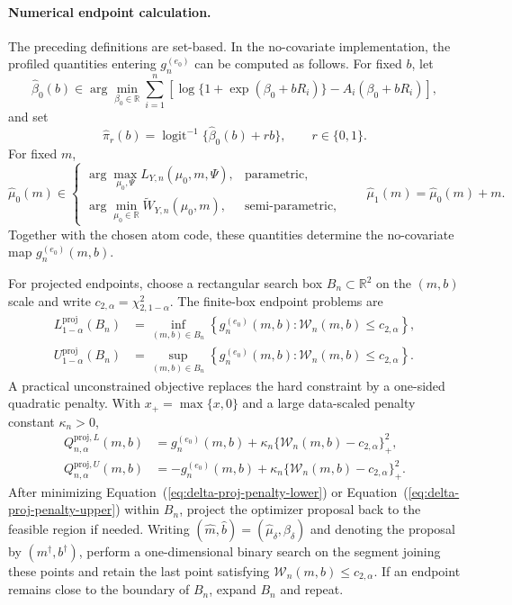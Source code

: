 \documentclass[11pt]{article}
\begin{document}
\paragraph{Numerical endpoint calculation.}
The preceding definitions are set-based. In the no-covariate implementation, the profiled quantities entering $g_n^{(e_0)}$ can be computed as follows. For fixed $b$, let
\[
  \widehat{\beta}_0(b)
  \in
  \arg\min_{\beta_0\in\mathbb{R}}
  \sum_{i=1}^n
  \left[
    \log\{1+\exp(\beta_0+bR_i)\}
    -
    A_i(\beta_0+bR_i)
  \right],
\]
and set
\[
  \widehat{\pi}_r(b)
  =
  \operatorname{logit}^{-1}\{\widehat{\beta}_0(b)+rb\},
  \qquad r\in\{0,1\}.
\]
For fixed $m$,
\[
  \widehat{\mu}_0(m)
  \in
  \begin{cases}
    \arg\max\limits_{\mu_0,\Psi} L_{Y,n}(\mu_0,m,\Psi), & \text{parametric},\\[0.8em]
    \arg\min\limits_{\mu_0\in\mathbb{R}} \widetilde{W}_{Y,n}(\mu_0,m), & \text{semi-parametric},
  \end{cases}
  \qquad
  \widehat{\mu}_1(m)=\widehat{\mu}_0(m)+m.
\]
Together with the chosen atom code, these quantities determine the no-covariate map $g_n^{(e_0)}(m,b)$.

For projected endpoints, choose a rectangular search box $B_n\subset\mathbb{R}^2$ on the $(m,b)$ scale and write $c_{2,\alpha}=\chi^2_{2,1-\alpha}$. The finite-box endpoint problems are
\begin{align*}
  L^{\mathrm{proj}}_{1-\alpha}(B_n)
  &=
  \inf_{(m,b)\in B_n}
  \left\{
    g_n^{(e_0)}(m,b):
    \mathcal{W}_n(m,b)\leq c_{2,\alpha}
  \right\},\\
  U^{\mathrm{proj}}_{1-\alpha}(B_n)
  &=
  \sup_{(m,b)\in B_n}
  \left\{
    g_n^{(e_0)}(m,b):
    \mathcal{W}_n(m,b)\leq c_{2,\alpha}
  \right\}.
\end{align*}
A practical unconstrained objective replaces the hard constraint by a one-sided quadratic penalty. With $x_+=\max\{x,0\}$ and a large data-scaled penalty constant $\kappa_n>0$,
\begin{align}
  Q^{\mathrm{proj},L}_{n,\alpha}(m,b)
  &=
  g_n^{(e_0)}(m,b)
  +
  \kappa_n\{\mathcal{W}_n(m,b)-c_{2,\alpha}\}_+^2,
  \label{eq:delta-proj-penalty-lower}\\
  Q^{\mathrm{proj},U}_{n,\alpha}(m,b)
  &=
  -g_n^{(e_0)}(m,b)
  +
  \kappa_n\{\mathcal{W}_n(m,b)-c_{2,\alpha}\}_+^2.
  \label{eq:delta-proj-penalty-upper}
\end{align}
After minimizing Equation~(\ref{eq:delta-proj-penalty-lower}) or Equation~(\ref{eq:delta-proj-penalty-upper}) within $B_n$, project the optimizer proposal back to the feasible region if needed. Writing $(\widehat{m},\widehat{b})=(\widehat{\mu}_\delta,\widehat{\beta}_\delta)$ and denoting the proposal by $(m^\dagger,b^\dagger)$, perform a one-dimensional binary search on the segment joining these points and retain the last point satisfying $\mathcal{W}_n(m,b)\leq c_{2,\alpha}$. If an endpoint remains close to the boundary of $B_n$, expand $B_n$ and repeat.
\end{document}
